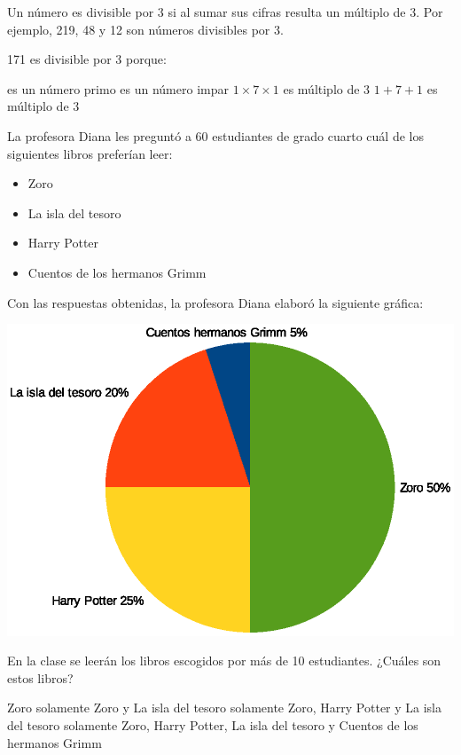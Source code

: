 \documentclass[10pt,addpoints]{exam}
\begin{document}
\begin{multicols}{2}
\begin{questions}
\begin{oneparchoices}
\end{oneparchoices}
\question Un número es divisible por 3 si al sumar sus cifras resulta un múltiplo de 3. Por ejemplo, 219, 48 y 12 son números divisibles por 3.

171 es divisible por 3 porque:
\begin{choices}
 es un número primo
 es un número impar
\choice $1 \times 7 \times 1$ es múltiplo de 3
\CorrectChoice $1+7+1$ es múltiplo de 3
\end{choices}
\question La profesora Diana les preguntó a 60 estudiantes de grado cuarto cuál de los siguientes libros preferían leer:
\begin{itemize}
\item Zoro
\item La isla del tesoro
\item Harry Potter
\item Cuentos de los hermanos Grimm
\end{itemize}
Con las respuestas obtenidas, la profesora Diana elaboró la siguiente gráfica:
\begin{center}
\includegraphics[scale=.5]{Images/Pantallazo-23.eps} 
\end{center}
En la clase se leerán los libros escogidos por más de 10 estudiantes. ¿Cuáles son estos libros?
\begin{choices}
\choice Zoro solamente
\choice Zoro y La isla del tesoro solamente
\CorrectChoice Zoro, Harry Potter y La isla del tesoro solamente
\choice Zoro, Harry Potter, La isla del tesoro y Cuentos de los hermanos Grimm

\end{choices}
\end{questions}
\end{multicols}
\end{document}

